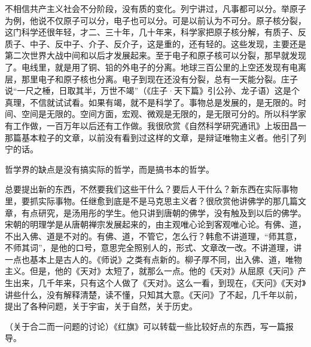 不相信共产主义社会不分阶段，没有质的变化。列宁讲过，凡事都可以分。举原子为例，他说不仅原子可以分，电子也可以分。可是以前认为不可分。原子核分裂，这门科学还很年轻，才二、三十年，几十年来，科学家把原子核分解，有质子、反质子、中子、反中子、介子、反介子，这是重的，还有轻的。这些发现，主要还是第二次世界大战中间和以后才发展起来。至于电子和原子核可以分裂，那早就发现了。电线里，就是用了铜、铅的外电子的分离。地球三百公里的上空还发现有电离层，那里电子和原子核也分离。电子到现在还没有分裂，总有一天能分裂。庄子说“一尺之棰，日取其半，万世不竭”（《庄子·天下篇》引公孙、龙子语）这是个真理，不信就试试看。如果有竭，就不是科学了。事物总是发展的，是无限的。时间、空间是无限的。空间方面，宏观、微观是无限的，是无限可分的。所以科学家有工作做，一百万年以后还有工作做。我很欣赏《自然科学研究通讯》上坂田昌一那篇基本粒子的文章，以前没有看到过这样的文章，是辩证唯物主义者。他引了列宁的话。

哲学界的缺点是没有搞实际的哲学，而是搞书本的哲学。

总要提出新的东西，不然要我们这些干什么？要后人干什么？新东西在实际事物里，要抓实际事物。任继愈到底是不是马克思主义者？很欣赏他讲佛学的那几篇文章，有点研究，是汤用彤的学生。他只讲到唐朝的佛学，没有触及到以后的佛学。宋朝的明理学是从唐朝禅宗发展起来的，由主观唯心论到客观唯心论。有佛、道，不出入佛、道是不对的。有佛、道，不管它，怎么行？韩愈不讲道理，“师其意，不师其词”，是他的口号，意思完全照别人的，形式、文章改一改。不讲道理，讲一点也基本上是古人的。《师说》之类有点新的。柳子厚不同，出入佛、道，唯物主义。但是，他的《天对》太短了，就那么一点。他的《天对》从屈原《天问》产生出来，几千年来，只有这个人做了《天对》。这么一看，到现在，《天问》《天对》讲些什么，没有解释清楚，读不懂，只知其大意。《天问》了不起，几千年以前，提出了各种问题，关于宇宙，关于自然，关于历史。

（关于合二而一问题的讨论）《红旗》可以转载一些比较好点的东西，写一篇报导。

